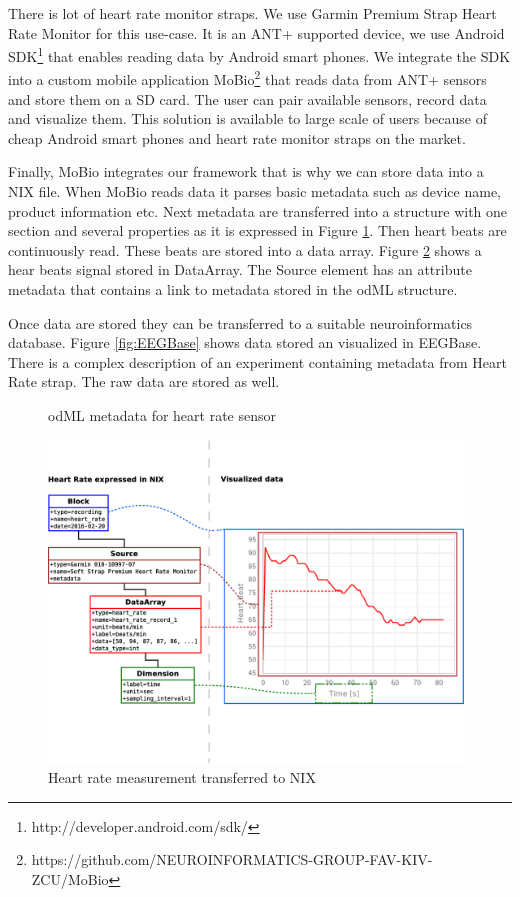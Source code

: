 \documentclass[conference]{IEEEtran}
\begin{document}
There is lot of heart rate monitor straps. We use Garmin Premium Strap Heart Rate Monitor for this use-case. It is an ANT+ supported device, we use Android SDK\footnote{http://developer.android.com/sdk/} that enables reading data by Android smart phones. We integrate the SDK into a custom mobile application MoBio\footnote{https://github.com/NEUROINFORMATICS-GROUP-FAV-KIV-ZCU/MoBio} that reads data from ANT+ sensors and store them on a SD card. The user can pair available sensors, record data and visualize them. This solution is available to large scale of users because of cheap Android smart phones and heart rate monitor straps on the market.

Finally, MoBio integrates our framework that is why we can store data into a NIX file. When MoBio reads data it parses basic metadata such as device name, product information etc. Next metadata are transferred into a structure with one section and several properties as it is expressed in Figure \ref{odML}. Then heart beats are continuously read. These beats are stored into a data array. Figure \ref{NIX-ex} shows a hear beats signal stored in DataArray. The Source element has an attribute metadata that contains a link to metadata stored in the odML structure.

Once data are stored they can be transferred to a suitable neuroinformatics database. Figure \ref{fig:EEGBase} shows data stored an visualized in EEGBase. There is a complex description of an experiment containing metadata from Heart Rate strap. The raw data are stored as well.

\begin{figure}

\caption{\label{odML}odML metadata for heart rate sensor}
\end{figure}

\begin{figure}
\centering\includegraphics[width=11cm]{NIX-example}
\caption{\label{NIX-ex}Heart rate measurement transferred to NIX}
\end{figure}
\end{document}
